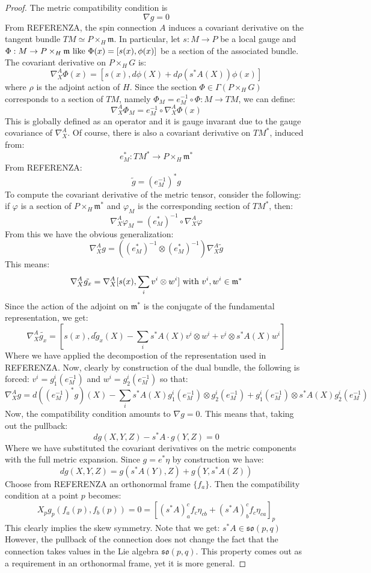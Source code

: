 \documentclass[12pt,a4paper]{report}
\theoremstyle{definition}
\theoremstyle{Theorem}
\theoremstyle{definition}
\theoremstyle{definition}
\begin{document}
	\begin{proof}
		The metric compatibility condition is 
		$$\nabla g=0$$
		From REFERENZA, the spin connection $A$ induces a covariant derivative on the tangent bundle $TM\simeq P\times_H \mathfrak{m}$. In particular, let $s:M\rightarrow P$ be a local gauge and $\Phi:M\rightarrow P\times_H \mathfrak{m}\hbox{ like }\Phi(x)=[s(x),\phi(x)]$ be a section of the associated bundle. The covariant derivative on $P\times_H G$ is:
		$$\nabla^A_X \Phi(x)=[s(x),d\phi(X)+d\rho(s^*A(X))\phi(x)]$$
		where $\rho$ is the adjoint action of $H$. Since the section $\Phi\in\Gamma(P\times_H G)$ corresponds to a section of $TM$, namely $\Phi_M=e_M^{-1}\circ\Phi:M\rightarrow TM$, we can define:
		$$\nabla_X^A\Phi_M=e_M^{-1}\circ \nabla^A_X \Phi(x)$$
		This is globally defined as an operator and it is gauge invarant due to the gauge covariance of $\nabla^A_X$. Of course, there is also a covariant derivative on $TM^*$, induced from:
		$$e_M^*:TM^*\rightarrow P\times_H \mathfrak{m}^*$$
		From REFERENZA:
		$$\tilde{g}=(e_M^{-1})^*g$$
		To compute the covariant derivative of the metric tensor, consider the following: if $\varphi$ is a section of $P\times_H \mathfrak{m}^*$ and $\varphi_M$ is the corresponding section of $TM^*$, then:
		$$\nabla_X^A\varphi_M=(e_M^*)^{-1}\circ \nabla_X^A\varphi$$
		From this we have the obvious generalization:
		$$\nabla_X^A g=((e_M^*)^{-1}\otimes(e_M^*)^{-1})\nabla_X^A \tilde{g}$$
		This means:
		$$\nabla_X^A \tilde{g_x}=\nabla_X^A[s(x),\sum_iv^i\otimes w^i]\hbox{ with }v^i,w^i\in \mathfrak{m}^*$$
		Since the action of the adjoint on $\mathfrak{m}^*$ is the conjugate of the fundamental representation, we get:
		$$\nabla_X^A \tilde{g_x}=[s(x),d\tilde{g}_x(X)-\sum_is^*A(X)v^i\otimes w^i+v^i\otimes s^*A(X)w^i]$$
		Where we have applied the decompostion of the representation used in REFERENZA. Now, clearly by construction of the dual bundle, the following is forced: $v^i=g^i_1(e_M^{-1})$ and $w^i=g^i_2(e_M^{-1})$ so that:
		$$\nabla_X^A g=d((e_M^{-1})^*g)(X)-\sum_i s^*A(X)g^i_1(e_M^{-1})\otimes g^i_2(e_M^{-1})+g^i_1(e_M^{-1})\otimes s^*A(X)g^i_2(e_M^{-1})$$ 
		Now, the compatibility condition amounts to $\nabla g=0$. This means that, taking out the pullback:
		$$dg(X,Y,Z)-s^*A\cdot g(Y,Z)=0$$
		Where we have substituted the covariant derivatives on the metric components with the full metric expansion. Since $g=e^*\eta$ by construction we have:
		$$dg(X,Y,Z)=g(s^*A(Y),Z)+g(Y,s^*A(Z))$$
		Choose from REFERENZA an orthonormal frame $\{f_a\}$. Then the compatibility condition at a point $p$ becomes:
		$$X_pg_p(f_a(p),f_b(p))=0=[(s^*A)_a^cf_c \eta_{cb}+(s^*A)_b^cf_c \eta_{ca}]_p$$
		This clearly implies the skew symmetry. Note that we get: $s^*A\in\mathfrak{so}(p,q)$
		However, the pullback of the connection does not change the fact that the connection takes values in the Lie algebra $\mathfrak{so}(p,q)$. This property comes out as a requirement in an orthonormal frame, yet it is more general.
	\end{proof}
\end{document}
